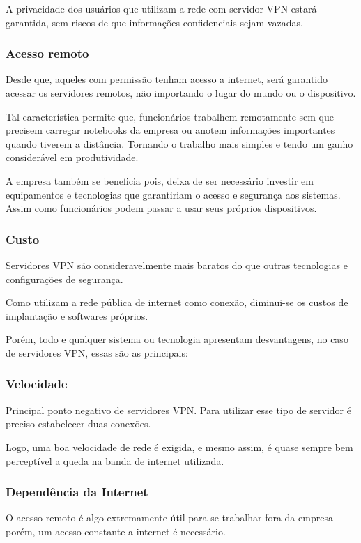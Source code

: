 \documentclass[12pt]{article}
\begin{document}
\begin{flushleft}
A privacidade dos usuários que utilizam a rede com servidor VPN estará garantida, sem riscos de que informações confidenciais sejam vazadas.

\subsubsection{Acesso remoto}
Desde que, aqueles com permissão tenham acesso a internet, será garantido acessar os servidores remotos, não importando o lugar do mundo ou o dispositivo. 

Tal característica permite que, funcionários trabalhem remotamente sem que precisem carregar notebooks da empresa ou anotem informações importantes quando tiverem a distância. Tornando o trabalho mais simples e tendo um ganho considerável em produtividade.

A empresa também se beneficia pois, deixa de ser necessário investir em equipamentos e tecnologias que garantiriam o acesso e segurança aos sistemas. Assim como funcionários podem passar a usar seus próprios dispositivos.

\subsubsection{Custo}
Servidores VPN são consideravelmente mais baratos do que outras tecnologias e configurações de segurança.

Como utilizam a rede pública de internet como conexão, diminui-se os custos de implantação e softwares próprios.


Porém, todo e qualquer sistema ou tecnologia apresentam desvantagens, no caso de servidores VPN, essas são as principais:

\subsubsection{Velocidade}
Principal ponto negativo de servidores VPN. Para utilizar esse tipo de servidor é preciso estabelecer duas conexões.

Logo, uma boa velocidade de rede é exigida, e mesmo assim, é quase sempre bem perceptível a queda na banda de internet utilizada.

\subsubsection{Dependência da Internet}
O acesso remoto é algo extremamente útil para se trabalhar fora da empresa porém, um acesso constante a internet é necessário.


\end{flushleft}
\end{document}
